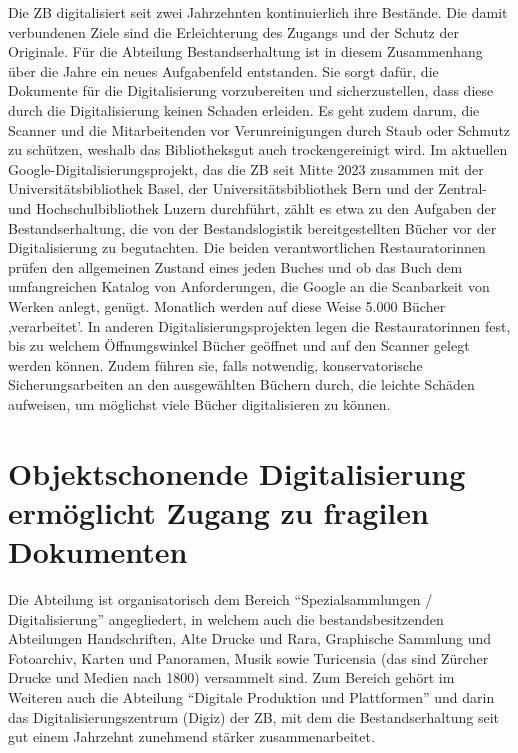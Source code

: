 \documentclass[a4paper,
fontsize=11pt,
oneside,
numbers=noperiodatend,
parskip=half-,
bibliography=totoc,
final
]{scrartcl}
\begin{document}
Die ZB digitalisiert seit zwei Jahrzehnten kontinuierlich ihre Bestände.
Die damit verbundenen Ziele sind die Erleichterung des Zugangs und der
Schutz der Originale. Für die Abteilung Bestandserhaltung ist in diesem
Zusammenhang über die Jahre ein neues Aufgabenfeld entstanden. Sie sorgt
dafür, die Dokumente für die Digitalisierung vorzubereiten und
sicherzustellen, dass diese durch die Digitalisierung keinen Schaden
erleiden. Es geht zudem darum, die Scanner und die Mitarbeitenden vor
Verunreinigungen durch Staub oder Schmutz zu schützen, weshalb das
Bibliotheksgut auch trockengereinigt wird. Im aktuellen
Google-Digitalisierungsprojekt, das die ZB seit Mitte 2023 zusammen mit
der Universitätsbibliothek Basel, der Universitätsbibliothek Bern und
der Zentral- und Hochschulbibliothek Luzern durchführt, zählt es etwa zu
den Aufgaben der Bestandserhaltung, die von der Bestandslogistik
bereitgestellten Bücher vor der Digitalisierung zu begutachten. Die
beiden verantwortlichen Restauratorinnen prüfen den allgemeinen Zustand
eines jeden Buches und ob das Buch dem umfangreichen Katalog von
Anforderungen, die Google an die Scanbarkeit von Werken anlegt, genügt.
Monatlich werden auf diese Weise 5.000 Bücher ‚verarbeitet'. In anderen
Digitalisierungsprojekten legen die Restauratorinnen fest, bis zu
welchem Öffnungswinkel Bücher geöffnet und auf den Scanner gelegt werden
können. Zudem führen sie, falls notwendig, konservatorische
Sicherungsarbeiten an den ausgewählten Büchern durch, die leichte
Schäden aufweisen, um möglichst viele Bücher digitalisieren zu können.

\hypertarget{objektschonende-digitalisierung-ermuxf6glicht-zugang-zu-fragilen-dokumenten}{%
\section{Objektschonende Digitalisierung ermöglicht Zugang zu
fragilen
Dokumenten}\label{objektschonende-digitalisierung-ermuxf6glicht-zugang-zu-fragilen-dokumenten}}

Die Abteilung ist organisatorisch dem Bereich \enquote{Spezialsammlungen
/ Digitalisierung} angegliedert, in welchem auch die bestandsbesitzenden
Abteilungen Handschriften, Alte Drucke und Rara, Graphische Sammlung und
Fotoarchiv, Karten und Panoramen, Musik sowie Turicensia (das sind
Zürcher Drucke und Medien nach 1800) versammelt sind. Zum Bereich gehört
im Weiteren auch die Abteilung \enquote{Digitale Produktion und
Plattformen} und darin das Digitalisierungszentrum (Digiz) der ZB, mit
dem die Bestandserhaltung seit gut einem Jahrzehnt zunehmend stärker
zusammenarbeitet.
\end{document}
